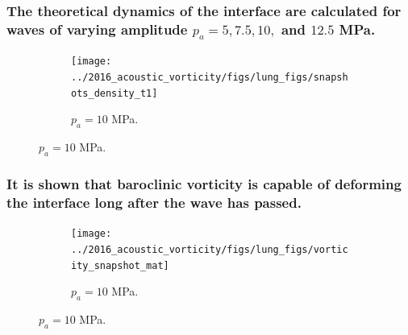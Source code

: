 \begin{frame}
  \frametitle{The theoretical dynamics of the interface are calculated for waves of varying amplitude $p_a=5, 7.5, 10,$ and $12.5$ MPa.} 
  \begin{figure}
    \centering
    \begin{subfigure}[b]{0.6\textwidth}
      \texttt{[image: ../2016\_acoustic\_vorticity/figs/lung\_figs/snapshots\_density\_t1]}
      \caption{$p_a = 10$ MPa.}
    \end{subfigure}
  \end{figure}
\end{frame}
% 
% 
\begin{frame}%
\frametitle{It is shown that baroclinic vorticity is capable of deforming the interface long after the wave has passed.}%
  \begin{figure}
    \centering
    \begin{subfigure}[b]{0.6\textwidth}
      \texttt{[image: ../2016\_acoustic\_vorticity/figs/lung\_figs/vorticity\_snapshot\_mat]}
      \caption{$p_a = 10$ MPa.}
    \end{subfigure}
  \end{figure}
\end{frame}

